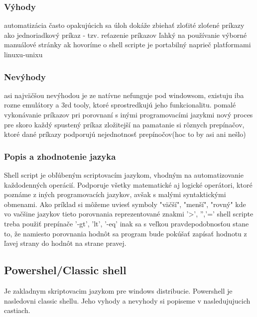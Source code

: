 \subsubsection{Výhody}
\noindent
automatizácia často opakujúcich sa úloh\newline
dokáže zbiehať zloťité zloťené príkazy ako jednoriadkový príkaz  - tzv. reťazenie príkazov\newline
ľahký na používanie\newline
výborné manuálové stránky\newline
ak hovoríme o shell scripte je portabilný naprieč platformami linuxu-unixu\newline
\subsubsection{Nevýhody}
\noindent
asi najväčšou nevýhodou je ze natívne nefunguje pod windowsom, existuju iba rozne emulátory a 3rd tooly, ktoré sprostredkujú jeho funkcionalitu.
\newline
pomalé vykonávanie príkazov pri porovnaní s inými programovacími jazykmi\newline
nový proces pre skoro každý spustený príkaz\newline
zložitejší na pamatanie si rôznych prepínačov, ktoré dané príkazy podporujú\newline
nejednotnosť prepínočov(hoc to by asi ani nešlo)\newline

\subsubsection{Popis a zhodnotenie jazyka}
\noindent
Shell script je obľúbeným scriptovacím jazykom, vhodným na automatizovanie každodenných operácií.
Podporuje všetky matematické aj logické operátori, ktoré poznáme z iných programovacích jazykov, avšak s malými syntaktickými obmenami. Ako príklad si môžeme uviesť symboly "väčší", "menší", "rovný" kde vo vačšine jazykov tieto porovnania reprezentované znakmi '>', '','='  shell scripte treba použiť prepínače '-gt', 'lt', '-eq' inak sa s veľkou pravdepodobnosťou stane to, že namiesto porovnania hodnôt sa program bude pokúšať zapísať hodnotu z ľavej strany do hodnôt na strane pravej.


\subsection{Powershel/Classic shell}
\indent
Je zakladnym skriptovacim jazykom pre windows distribucie.
Powershell je nasledovni classic shellu.  
Jeho vyhody a nevyhody si popiseme v nasledujujucich castiach.

